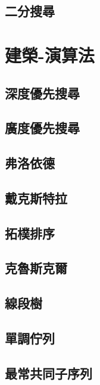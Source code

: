 \subsection{二分搜尋}
\raggedbottom
\hrulefill

\section{建榮-演算法}
\subsection{深度優先搜尋}
\raggedbottom
\hrulefill
\subsection{廣度優先搜尋}
\raggedbottom
\hrulefill
\subsection{弗洛依德}
\raggedbottom
\hrulefill
\subsection{戴克斯特拉}
\raggedbottom
\hrulefill
\subsection{拓樸排序}
\raggedbottom
\hrulefill
\subsection{克魯斯克爾}
\raggedbottom
\hrulefill
\subsection{線段樹}
\raggedbottom
\hrulefill
\subsection{單調佇列}
\raggedbottom
\hrulefill
\subsection{最常共同子序列}
\raggedbottom
\hrulefill
